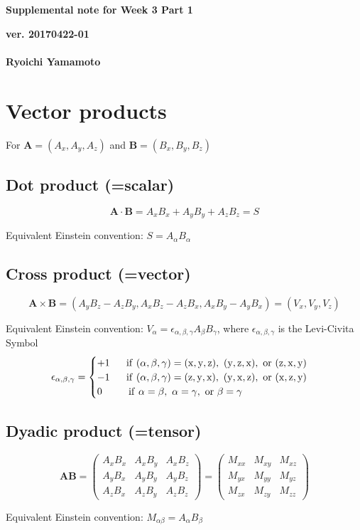 \documentclass[a4paper,11pt]{article}
\begin{document}
\begin{center}
  {\LARGE\bf Supplemental note for Week 3 Part 1}
  \end{center}
\begin{flushright}
  {\large\bf ver. 20170422-01}\\
 \ \\
{\large\bf Ryoichi Yamamoto}\\
\end{flushright}

\section{Vector products}

For $\mathbf{A}=(A_x, A_y,A_z)$ and  $\mathbf{B}=(B_x, B_y,B_z)$

\subsection{Dot product (=scalar)}

$$
\mathbf{A}\cdot\mathbf{B}=A_xB_x+A_yB_y+A_zB_z=S
$$

Equivalent Einstein convention: $S=A_\alpha B_\alpha$

\subsection{Cross product (=vector)}

$$
\mathbf{A}\times\mathbf{B}=(
      A_yB_z -  A_zB_y ,
      A_xB_z -  A_zB_x ,
      A_xB_y -  A_yB_x 
)
=(V_x,V_y,V_z)
$$

Equivalent Einstein convention: $V_\alpha=\epsilon_{\alpha,\beta,\gamma}A_\beta B_\gamma$, where $\epsilon_{\alpha,\beta,\gamma}$ is the Levi-Civita Symbol
$$
\epsilon_{\alpha,\beta,\gamma}=
\begin{cases}
    +1\ \ \ \ \ {\rm if\ ({\it \alpha,\beta,\gamma})=(x,y,z),\ (y,z,x),\ or\ (z,x,y)}\\
    -1 \ \ \ \ \ {\rm if\ ({\it \alpha,\beta,\gamma})=(z,y,x),\ (y,x,z),\ or\ (x,z,y)}\\
    0\ \ \ \ \ \ \ \ {\rm if}\ \alpha=\beta,\ \alpha=\gamma,\ {\rm or}\ \beta=\gamma
\end{cases}
$$

\subsection{Dyadic product (=tensor)}

$$
\mathbf{A}\mathbf{B}=\left(
\begin{array}{ccc}
      A_xB_x & A_xB_y & A_xB_z \\
      A_yB_x & A_yB_y & A_yB_z \\
      A_zB_x & A_zB_y & A_zB_z
\end{array}\right)
=\left(
\begin{array}{ccc}
      M_{xx} & M_{xy} & M_{xz} \\
      M_{yx} & M_{yy} & M_{yz} \\
      M_{zx} & M_{zy} & M_{zz}
\end{array}\right)
$$

Equivalent Einstein convention: $M_{\alpha\beta}=A_\alpha B_\beta$
\end{document}
